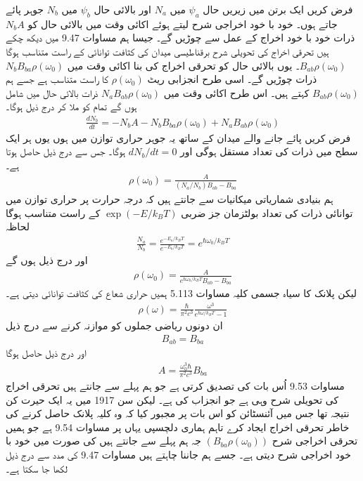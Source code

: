 \documentclass[leqno, b5paper]{khalid-urdu-book}
\begin{document}
فرض کریں ایک برتن میں زیریں حال \(\psi_a\) میں \(N_a\) اور بالائی حال \(\psi_b\) میں \(N_b\) جوہر پائے جاتے ہوں۔ خود با خود اخراجی شرح  لیتے ہوئے اکائی وقت میں بالائی حال کو \(N_bA\) ذرات خود با خود اخراج کے عمل سے چوڑیں گے۔ جیسا ہم مساوات \num{9.47} میں دیکھ چکے ہیں تحرقی اخراج کی تحویلی شرح برقناطیسی میدان کی کثافت توانائی کے راست متناسب ہوگا \(B_{ab}\rho(\omega_0)\)۔ یوں بالائی حال کو تحرقی اخراج کی بنا اکائی وقت میں \(N_bB_{ba}\rho(\omega_0)\) ذرات چوڑیں گے۔ اسی طرح انجزابی ریٹ \(\rho(\omega_0)\) کا راست متناسب ہے جسے ہم \(B_{ab}\rho(\omega_0)\) کہتے ہیں۔ اس طرح اکائی وقت میں \(N_aB_{ab}\rho(\omega_0)\) ذرات بالائی حال میں شامل ہوں گے تمام کو ملا کر درج ذیل ہوگا۔
\begin{align}
	\frac{dN_b}{dt} = -N_bA-N_bB_{ba}\rho(\omega_0)+N_aB_{ab}\rho(\omega_0)
\end{align}
فرض کریں پائے جانے والے میدان کے ساتھ یہ جوہر حراری توازن میں ہوں یوں ہر ایک سطح میں ذرات کی تعداد مستقل ہوگی اور \(dN_b/dt = 0\) ہوگا۔ جس سے درج ذیل حاصل ہوتا ہے۔
\begin{align}
	\rho(\omega_0) = \frac{A}{(N_a/N_b)B_{ab}-B_{ba}}
\end{align}
ہم بنیادی شماریاتی میکانیات سے جانتے ہیں کہ درجہ حرارت  پر حراری توازن میں توانائی  ذرات کی تعداد بولٹزمان جز ضربی \(\exp(-E/k_BT)\) کے راست متناسب ہوگا لحاظہ
\begin{align}
	\frac{N_a}{N_b} = \frac{e^{-E_a/k_{B}T}}{e^{-E_b/k_BT}} = e^{\hbar\omega_0/k_BT}
\end{align}
اور درج ذیل ہوں گے
\begin{align}
	\rho(\omega_0) = \frac{A}{e^{\hbar\omega_0/k_BT}B_{ab}-B_{ba}}
\end{align}
لیکن پلانک کا سیاہ جسمی کلیہ مساوات \num{5.113} ہمیں حراری شعاع کی کثافت توانائی دیتی ہے۔
\begin{align}
	\rho(\omega) = \frac{\hbar}{\pi^2c^3}\frac{\omega^3}{e^{\hbar\omega/k_BT}-1}
\end{align}
ان دونوں ریاضی جملوں کو موازنہ کرنے سے درج ذیل 
\begin{align}
	B_{ab} = B_{ba}
\end{align}
اور درج ذیل حاصل ہوگا
\begin{align}
	A = \frac{\omega^3_0\hbar}{\pi^2c^3}B_{ba}
\end{align}
مساوات \num{9.53} اُس بات کی تصدیق کرتی ہے جو ہم پہلے سے جانتے ہیں تحرقی اخراج کی تحویلی شرح وہی ہے جو انجزاب کی ہے۔ لیکن سن \num{1917} میں یہ ایک حیرت کن نتیجہ تھا جس میں آئنسٹائن کو اس بات پر مجبور کیا کہ وہ کلیہ پلانک حاصل کرنے کی خاطر تحرقی اخراج ایجاد کرے تاہم ہماری دلچسپی یہاں پر مساوات \num{9.54} ہے جو ہمیں تحرقی اخراجی شرح \((B_{ba}\rho(\omega_0))\) جہ ہم پہلے سے جانتے ہیں کی صورت میں خود با خود اخراجی شرح  دیتی ہے۔ جسے ہم جاننا چاہتے ہیں مساوات \num{9.47} کی مدد سے درج ذیل لکھا جا سکتا ہے۔
\end{document}

